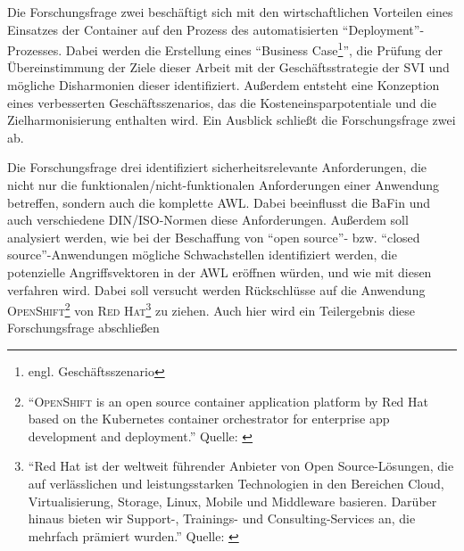 Die Forschungsfrage zwei beschäftigt sich mit den wirtschaftlichen Vorteilen eines Einsatzes der Container auf den Prozess des automatisierten \enquote{Deployment}-Prozesses. Dabei werden die Erstellung eines \enquote{Business Case\footnote{engl. Geschäftsszenario}}, die Prüfung der Übereinstimmung der Ziele dieser Arbeit mit der Geschäftsstrategie der \ac{SVI} und mögliche Disharmonien dieser identifiziert. Außerdem entsteht eine Konzeption eines verbesserten Geschäftsszenarios, das die Kosteneinsparpotentiale und die Zielharmonisierung enthalten wird. Ein Ausblick schließt die Forschungsfrage zwei ab. \par

Die Forschungsfrage drei identifiziert sicherheitsrelevante Anforderungen, die nicht nur die funktionalen/nicht-funktionalen Anforderungen einer Anwendung betreffen, sondern auch die komplette \ac{AWL}. Dabei beeinflusst die \ac{BaFin} und auch verschiedene \textsc{DIN/ISO}-Normen diese Anforderungen. Außerdem soll analysiert werden, wie bei der Beschaffung von \enquote{open source}- bzw. \enquote{closed source}-Anwendungen mögliche Schwachstellen identifiziert werden, die potenzielle Angriffsvektoren in der \ac{AWL} eröffnen würden, und wie mit diesen verfahren wird. Dabei soll versucht werden Rückschlüsse auf die Anwendung \textsc{OpenShift\footnote{\enquote{\textsc{OpenShift} is an open source container application platform by Red Hat based on the Kubernetes container orchestrator for enterprise app development and deployment.} Quelle: \cite[][]{red_hat_inc_openshift_2020}}} von \textsc{Red Hat\footnote{\enquote{Red Hat ist der weltweit führender Anbieter von Open Source-Lösungen, die auf verlässlichen und leistungsstarken Technologien in den Bereichen Cloud, Virtualisierung, Storage, Linux, Mobile und Middleware basieren. Darüber hinaus bieten wir Support-, Trainings- und Consulting-Services an, die mehrfach prämiert wurden.} Quelle: \cite[][]{red_hat_inc_red_2020}}} zu ziehen. Auch hier wird ein Teilergebnis diese Forschungsfrage abschließen


